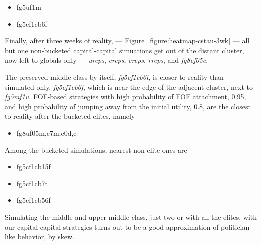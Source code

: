 \documentclass[10pt,oneside]{memoir}
\begin{document}
\begin{Spacing}{2}
\begin{itemize}
\item fg5uf1m

\item fg5cf1cb6f
\end{itemize}

Finally, after three weeks of reality, --- Figure~\ref{figure:heatmap-cstau-3wk} --- all but one non-bucketed capital-capital simuations get out of the distant cluster, now left to globals only --- {\itshape ureps}, {\itshape ereps}, {\itshape creps}, {\itshape rreps}, and {\itshape fg8cf05c}.


The preserved middle class by itself, {\itshape fg5cf1cb6t}, is closer to reality than simulated-only, {\itshape fg5cf1cb6f}, which is near the edge of the adjacent cluster, next to {\itshape fg5mf1u}.  FOF-based strategies with high probability of FOF attachment, 0.95,  and high probability of jumping away from the initial utility, 0.8, are the closest to reality after the bucketed elites, namely


\begin{itemize}


\item fg8uf05{m,c7m,c0d,c}
\end{itemize}

Among the bucketed simulations, nearest non-elite ones are


\begin{itemize}


\item fg5cf1cb15f

\item fg5cf1cb7t

\item fg5cf1cb56f
\end{itemize}

Simulating the middle and upper middle class, just two or with all the elites, with our capital-capital strategies turns out to be a good approximation of politician-like behavior, by skew.




\end{Spacing}
\end{document}
